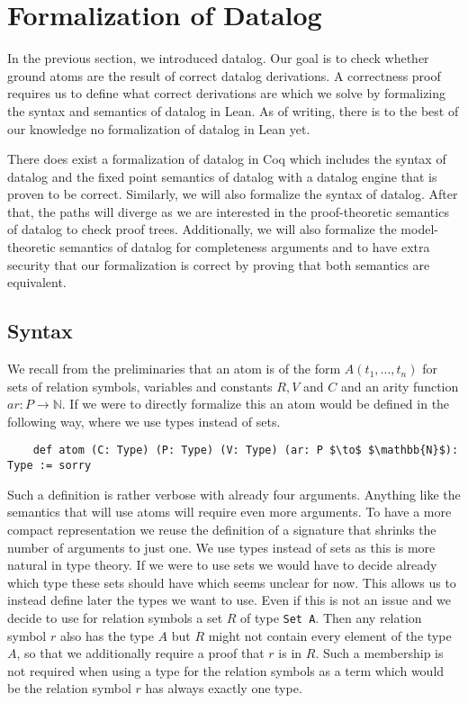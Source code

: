 \chapter{Formalization of Datalog}\label{sec:formDatalog}
In the previous section, we introduced datalog. Our goal is to check whether ground atoms are the result of correct datalog derivations. A correctness proof requires us to define what correct derivations are which we solve by formalizing the syntax and semantics of datalog in Lean. As of writing, there is to the best of our knowledge no formalization of datalog in Lean yet. 

There does exist a formalization of datalog in Coq\cite{datalogCoq} which includes the syntax of datalog and the fixed point semantics of datalog with a datalog engine that is proven to be correct. Similarly, we will also formalize the syntax of datalog. After that, the paths will diverge as we are interested in the proof-theoretic semantics of datalog to check proof trees. Additionally, we will also formalize the model-theoretic semantics of datalog for completeness arguments and to have extra security that our formalization is correct by proving that both semantics are equivalent.

\section{Syntax}

We recall from the preliminaries that an atom is of the form $A(t_1, \dots ,t_n)$ for sets of relation symbols, variables and constants $R, V$ and $C$ and an arity function $ar: P \to \mathbb{N}$. If we were to directly formalize this an atom would be defined in the following way, where we use types instead of sets.

\begin{lstlisting}
    def atom (C: Type) (P: Type) (V: Type) (ar: P $\to$ $\mathbb{N}$): Type := sorry
\end{lstlisting}

Such a definition is rather verbose with already four arguments. Anything like the semantics that will use atoms will require even more arguments. To have a more compact representation we reuse the definition of a signature that shrinks the number of arguments to just one.  We use types instead of sets as this is more natural in type theory. If we were to use sets we would have to decide already which type these sets should have which seems unclear for now. This allows us to instead define later the types we want to use. Even if this is not an issue and we decide to use for relation symbols a set $R$ of type \lstinline|Set A|. Then any relation symbol $r$ also has the type $A$ but $R$ might not contain every element of the type $A$, so that we additionally require a proof that $r$ is in $R$. Such a membership is not required when using a type for the relation symbols as a term which would be the relation symbol $r$ has always exactly one type. 

